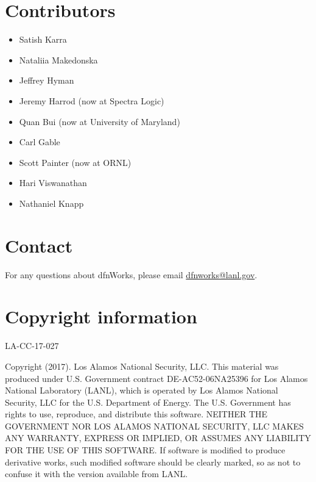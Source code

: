 \documentclass[letterpaper,10pt,english]{sphinxmanual}
\begin{document}
\section{Contributors}
\label{intro:contributors}\begin{itemize}
\item {} 
Satish Karra

\item {} 
Nataliia Makedonska

\item {} 
Jeffrey Hyman

\item {} 
Jeremy Harrod (now at Spectra Logic)

\item {} 
Quan Bui (now at University of Maryland)

\item {} 
Carl Gable

\item {} 
Scott Painter (now at ORNL)

\item {} 
Hari Viswanathan

\item {} 
Nathaniel Knapp

\end{itemize}


\section{Contact}
\label{intro:contact}
For any questions about dfnWorks, please email \href{mailto:dfnworks@lanl.gov}{dfnworks@lanl.gov}.


\section{Copyright information}
\label{intro:copyright-information}
LA-CC-17-027

Copyright (2017).  Los Alamos National Security, LLC. This material was produced under U.S. Government contract DE-AC52-06NA25396 for Los Alamos National Laboratory (LANL), which is operated by Los Alamos National Security, LLC for the U.S. Department of Energy. The U.S. Government has rights to use, reproduce, and distribute this software.  NEITHER THE GOVERNMENT NOR LOS ALAMOS NATIONAL SECURITY, LLC MAKES ANY WARRANTY, EXPRESS OR IMPLIED, OR ASSUMES ANY LIABILITY FOR THE USE OF THIS SOFTWARE.  If software is modified to produce derivative works, such modified software should be clearly marked, so as not to confuse it with the version available from LANL.
\end{document}
